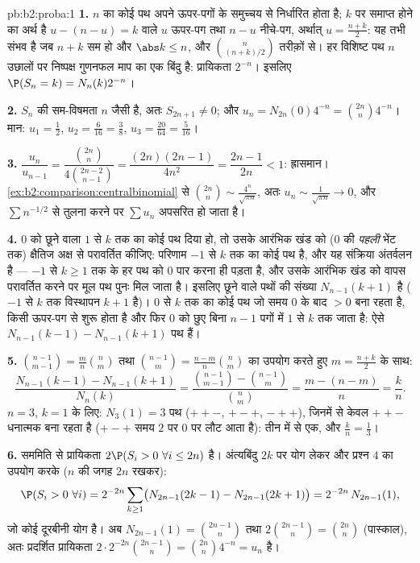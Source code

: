 \begin{solution}{pb:b2:proba:1}
\textbf{1.}  $n$ का कोई पथ अपने ऊपर-पगों के समुच्चय से
निर्धारित होता है; $k$ पर समाप्त होने का अर्थ है $u - (n - u) = k$ वाले $u$
ऊपर-पग तथा $n - u$ नीचे-पग, अर्थात् $u = \frac{n+k}2$: यह तभी संभव है जब $n + k$ सम हो
और $\abs k \leq n$, और $\binom{n}{(n+k)/2}$ तरीक़ों से। हर विशिष्ट पथ $n$ उछालों पर निष्पक्ष
गुणनफल माप का एक बिंदु है: प्रायिकता $2^{-n}$। इसलिए $\P(S_n = k) = N_n(k)2^{-n}$।

\textbf{2.} $S_n$ की सम-विषमता $n$ जैसी है, अतः $S_{2n+1} \neq
0$; और $u_n = N_{2n}(0)4^{-n} = \binom{2n}n4^{-n}$। मान:
$u_1 = \frac12$, $u_2 = \frac6{16} = \frac38$, $u_3 =
\frac{20}{64} = \frac5{16}$।

\textbf{3.} $\dfrac{u_n}{u_{n-1}} =
\dfrac{\binom{2n}n}{4\binom{2n-2}{n-1}} =
\dfrac{(2n)(2n-1)}{4n^2} = \dfrac{2n-1}{2n} < 1$: ह्रासमान। \cref{ex:b2:comparison:centralbinomial} से $\binom{2n}n \sim
\frac{4^n}{\sqrt{\pi n}}$, अतः $u_n \sim \frac1{\sqrt{\pi n}}
\to 0$, और $\sum
n^{-1/2}$ से तुलना
करने पर $\sum u_n$ अपसरित हो जाता है।

\textbf{4.} $0$ को छूने वाला $1$ से $k$ तक का कोई पथ दिया हो, तो
उसके आरंभिक खंड को ($0$ की \emph{पहली} भेंट तक) क्षैतिज अक्ष से
परावर्तित कीजिए: परिणाम $-1$ से $k$ तक का कोई पथ है, और यह
संक्रिया अंतर्वलन है --- $-1$ से $k \geq 1$ तक के हर पथ को $0$ पार करना
ही पड़ता है, और उसके आरंभिक खंड को वापस परावर्तित करने पर मूल पथ
पुनः मिल जाता है। इसलिए छूने वाले पथों की संख्या $N_{n-1}(k + 1)$ है ($-1$ से
$k$ तक विस्थापन $k + 1$ है)। $0$ से $k$ तक का कोई पथ जो समय $0$
के बाद $>
0$ बना रहता है, किसी ऊपर-पग से शुरू होता है और फिर $0$
को छुए बिना $n - 1$ पगों में $1$ से $k$ तक जाता है: ऐसे $N_{n-1}(k-1) - N_{n-1}(k+1)$ पथ हैं।

\textbf{5.} $\binom{n-1}{m-1} = \frac mn\binom nm$ तथा $\binom{n-1}{m} =
\frac{n-m}n\binom nm$ का उपयोग करते हुए $m = \frac{n+k}2$ के साथ:
\[
\frac{N_{n-1}(k-1) - N_{n-1}(k+1)}{N_n(k)}
= \frac{\binom{n-1}{m-1} - \binom{n-1}{m}}{\binom nm}
= \frac{m - (n - m)}{n} = \frac kn .
\]
$n = 3$, $k = 1$ के लिए: $N_3(1) = 3$ पथ ($++-$, $+-+$, $-++$), जिनमें से केवल $++-$
धनात्मक बना रहता है ($+-+$ समय $2$ पर $0$ पर लौट आता है): तीन में
से एक, और $\frac kn = \frac13$।

\textbf{6.} सममिति से प्रायिकता $2\P(S_i > 0\ \forall
i \leq 2n)$ है। अंत्यबिंदु $2k$ पर योग लेकर
और प्रश्न 4 का उपयोग करके ($n$ की जगह $2n$ रखकर):
\[
\P(S_i > 0\ \forall i) = 2^{-2n}\sum_{k\geq1}
\bigl(N_{2n-1}(2k-1) - N_{2n-1}(2k+1)\bigr)
= 2^{-2n}\,N_{2n-1}(1),
\]
जो कोई दूरबीनी योग है। अब $N_{2n-1}(1) = \binom{2n-1}{n}$ तथा $2\binom{2n-1}n = \binom{2n}n$ (पास्काल), अतः प्रदर्शित
प्रायिकता $2\cdot2^{-2n}\binom{2n-1}n =
\binom{2n}n4^{-n} = u_n$ है।


\end{solution}
